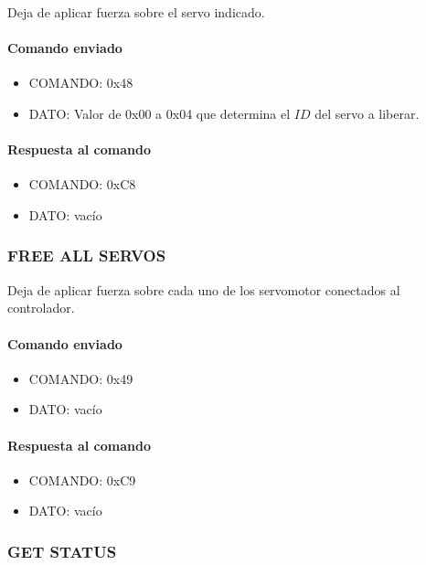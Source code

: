 Deja de aplicar fuerza sobre el servo indicado.

\paragraph*{Comando enviado}

\begin{itemize}
	\item{COMANDO:} 0x48
	\item{DATO:} Valor de 0x00 a 0x04 que determina el $ID$ del servo a liberar.
\end{itemize}

\paragraph*{Respuesta al comando}

\begin{itemize}
	\item{COMANDO:} 0xC8
	\item{DATO:} vac\'io
\end{itemize}

\subsubsection{FREE ALL SERVOS}
\label{hA_protocolo_free_all_servos}

Deja de aplicar fuerza sobre cada uno de los servomotor conectados al controlador.

\paragraph*{Comando enviado}

\begin{itemize}
	\item{COMANDO:} 0x49
	\item{DATO:} vac\'io
\end{itemize}

\paragraph*{Respuesta al comando}

\begin{itemize}
	\item{COMANDO:} 0xC9
	\item{DATO:} vac\'io
\end{itemize}

\subsubsection{GET STATUS}
\label{hA_protocolo_get_status_servos}

